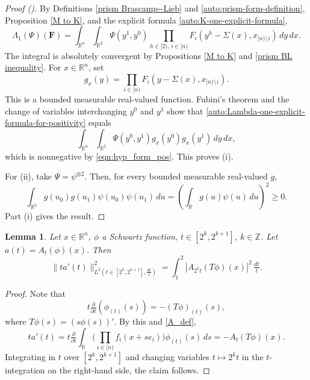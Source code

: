 \documentclass[12pt,reqno]{amsart}
\newcommand{\auto}{{({\tiny\faCar})}}
\theoremstyle{plain}
\newtheorem{lemma}[theorem]{Lemma}
\numberwithin{equation}{section}
\theoremstyle{remark}
\newcommand{\uses}[1]{}
\newcommand{\usesdefs}[1]{}
\newcommand{\Z}{{\mathbb Z}}
\newcommand{\R}{{\mathbb R}}
\newcommand{\F}{\mathbf{F}}
\begin{document}
\begin{proof}[Proof \auto]
By Definitions \ref{prism Brascamp--Lieb} and \ref{auto:prism-form-definition}, Proposition \ref{M to K}, and the explicit formula \eqref{auto:K-one-explicit-formula},
\begin{equation}\label{auto:Lambda-one-explicit-formula-for-positivity}
\Lambda_1(\Psi)(\F)
=
\int_{\R^n}\int_{\R^2}
\Psi(y^1,y^0)
\prod_{h\in[2),\,i\in[n)}
F_i(y^h-\Sigma(x),x_{[n)\setminus i})
\,dy\,dx.
\end{equation}
The integral is absolutely convergent by Propositions \ref{M to K} and \ref{prism BL inequality}. For $x\in\R^n$, set
\begin{equation}\label{auto:Lambda-one-positivity-test-function}
g_x(y)=\prod_{i\in[n)}F_i(y-\Sigma(x),x_{[n)\setminus i}).
\end{equation}
This is a bounded measurable real-valued function. Fubini's theorem and the change of variables interchanging $y^0$ and $y^1$ show that \eqref{auto:Lambda-one-explicit-formula-for-positivity} equals
\begin{equation}\label{auto:Lambda-one-positive-fiber-integral}
\int_{\R^n}\int_{\R^2}
\Psi(y^0,y^1)g_x(y^0)g_x(y^1)\,dy\,dx,
\end{equation}
which is nonnegative by \eqref{eqn:hyp_form_pos}. This proves (i).

For (ii), take $\Psi=\psi^{\otimes2}$. Then, for every bounded measurable real-valued $g$,
\begin{equation}\label{auto:tensor-square-kernel-positivity}
\int_{\R^2}g(u_0)g(u_1)\psi(u_0)\psi(u_1)\,du
=
\left(\int_\R g(u)\psi(u)\,du\right)^2
\ge0.
\end{equation}
Part (i) gives the result.
\end{proof}

\begin{lemma} \label{lem:ftc_ATphi}\uses{}\usesdefs{A_def}
Let $x\in \R^n$, $\phi$ a Schwartz function,  $t\in [2^k, 2^{k+1}]$, $k\in \Z$. Let $a(t)=A_t(\phi)(x)$. Then
\begin{equation}\label{auto:average-logarithmic-derivative-identity} \|ta'(t)\|_{L^2(t\in [2^k, 2^{k+1}],\tfrac{dt}{t})}^2 = \int_{1}^2 |A_{2^k t}(T\phi)(x)|^2\,\tfrac{dt}{t}. \end{equation}
\end{lemma}

\begin{proof}
Note that
\begin{equation}\label{shortlongftc_reduction_pf3}
t\tfrac{\partial}{\partial t}(\phi_{(t)}(s)) = -(T\phi)_{(t)}(s),
\end{equation}
where $T\phi(s) = (s \phi(s))'$.
    By this and \eqref{A_def},
\[ ta'(t) = t\tfrac{\partial}{\partial t}\int_{\mathbb{R}} \Big(\prod_{i\in [n)} f_i(x+se_i)\Big)\phi_{(t)}(s)\,ds = -A_t(T\phi)(x). \]
Integrating in $t$ over $[2^k,2^{k+1}]$ and changing variables $t \mapsto 2^k t$ in the $t$-integration on the right-hand side,
the claim follows.
\end{proof}
\end{document}
